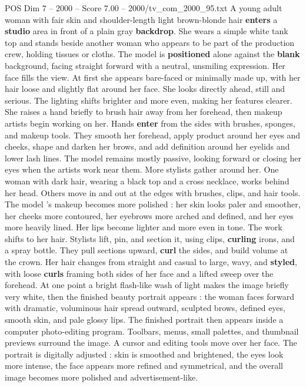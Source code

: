 \begin{textsample}{POS Dim 7 – 2000 – Score 7.00 – 2000/tv\_com\_2000\_95.txt}  \label{ex:f7_pos_074}
A young adult woman with fair skin and shoulder-length light brown-blonde hair \textbf{enters} a \textbf{studio} area in front of a plain gray \textbf{backdrop}.
She wears a simple white tank top and stands beside another woman who appears to be part of the production crew, holding tissues or cloths.
The model is \textbf{positioned} alone against the \textbf{blank} background, facing straight forward with a neutral, unsmiling expression.
Her face fills the view.
At first she appears bare-faced or minimally made up, with her hair loose and slightly flat around her face.
She looks directly ahead, still and serious.
The lighting shifts brighter and more even, making her features clearer.
She raises a hand briefly to brush hair away from her forehead, then makeup artists begin working on her.
Hands \textbf{enter} from the sides with brushes, sponges, and makeup tools.
They smooth her forehead, apply product around her eyes and cheeks, shape and darken her brows, and add definition around her eyelids and lower lash lines.
The model remains mostly passive, looking forward or closing her eyes when the artists work near them.
More stylists gather around her.
One woman with dark hair, wearing a black top and a cross necklace, works behind her head.
Others move in and out at the edges with brushes, clips, and hair tools.
The model ’s makeup becomes more polished : her skin looks paler and smoother, her cheeks more contoured, her eyebrows more arched and defined, and her eyes more heavily lined.
Her lips become lighter and more even in tone.
The work shifts to her hair.
Stylists lift, pin, and section it, using clips, \textbf{curling} irons, and a spray bottle.
They pull sections upward, \textbf{curl} the sides, and build volume at the crown.
Her hair changes from straight and casual to large, wavy, and \textbf{styled}, with loose \textbf{curls} framing both sides of her face and a lifted sweep over the forehead.
At one point a bright flash-like wash of light makes the image briefly very white, then the finished beauty portrait appears : the woman faces forward with dramatic, voluminous hair spread outward, sculpted brows, defined eyes, smooth skin, and pale glossy lips.
The finished portrait then appears inside a computer photo-editing program.
Toolbars, menus, small palettes, and thumbnail previews surround the image.
A cursor and editing tools move over her face.
The portrait is digitally adjusted : skin is smoothed and brightened, the eyes look more intense, the face appears more refined and symmetrical, and the overall image becomes more polished and advertisement-like.

\end{textsample}
